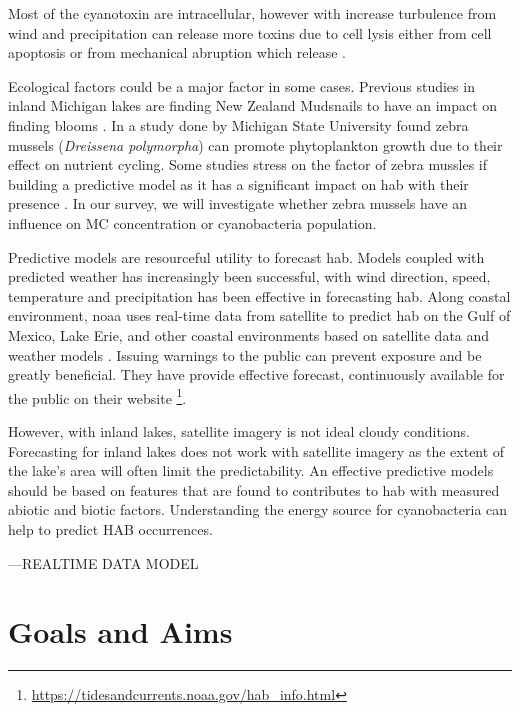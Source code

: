 Most of the cyanotoxin are intracellular, however with increase turbulence from wind and precipitation can release more toxins due to cell lysis either from cell apoptosis or from mechanical abruption which release \cite{rohrlack_fate_2007}.



Ecological factors could be a major factor in some cases. Previous studies in inland Michigan lakes are finding New Zealand Mudsnails to have an impact on finding blooms \cite{vanderploeg_zebra_2001}.
In a study done by Michigan State University \cite{raikow_dominance_2004} found zebra mussels (\emph{Dreissena polymorpha}) can promote phytoplankton growth due to their effect on nutrient cycling. Some studies stress on the factor of zebra mussles if building a predictive model as it has a significant impact on \gls{hab} with their presence \cite{lavrentyev_effects_1995, knoll_invasive_2008, raikow_dominance_2004}. In our survey, we will investigate whether zebra mussels have an influence on MC concentration or cyanobacteria population.



Predictive models are resourceful utility to forecast \gls{hab}. Models coupled with predicted weather  has increasingly been successful, with wind direction, speed, temperature and precipitation  has been effective in forecasting \gls{hab}. Along coastal environment,   \gls{noaa} uses real-time data from satellite to predict \gls{hab} on the Gulf of Mexico, Lake Erie, and other coastal environments based on satellite data and weather models \cite{kavanaugh_assessment_2013}.
Issuing warnings to the public can prevent exposure and be greatly beneficial. They have provide effective forecast, continuously available for the public on their website \footnote{\url{https://tidesandcurrents.noaa.gov/hab_info.html}}.

However, with inland lakes, satellite imagery is not ideal cloudy conditions. Forecasting for inland lakes does not work with satellite imagery as the extent of the lake's area will often limit the predictability.
An effective predictive models should be based on features that are found to contributes to \gls{hab} with measured abiotic and biotic factors.
Understanding the energy source for cyanobacteria can help to predict HAB occurrences.

---REALTIME DATA MODEL



 \section{Goals and Aims}

